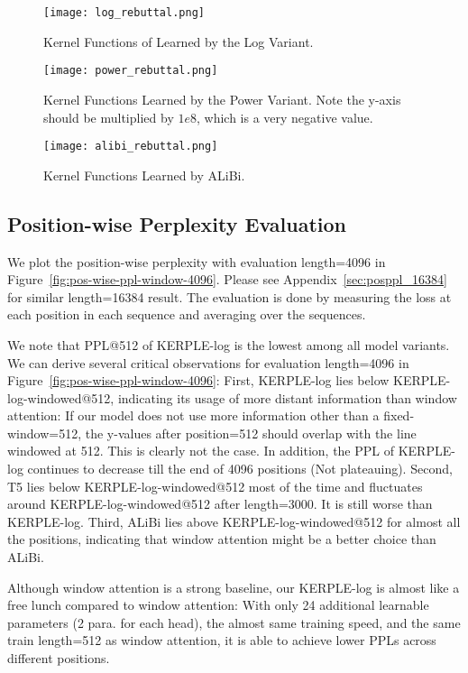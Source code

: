 \begin{figure*}[!ht]
\centering
\caption{Kernel Functions of Learned by the Log Variant.}
\texttt{[image: log\_rebuttal.png]}
\label{fig:log_rebuttal}
\end{figure*}

\begin{figure*}[!ht]
\centering
\caption{Kernel Functions Learned by the Power Variant. Note the y-axis should be multiplied by $1e8$, which is a very negative value.}
\texttt{[image: power\_rebuttal.png]}
\label{fig:power_rebuttal}
\end{figure*}

\begin{figure*}[!ht]
\centering
\caption{Kernel Functions Learned by ALiBi.}
\texttt{[image: alibi\_rebuttal.png]}
\label{fig:alibi_rebuttal}
\end{figure*}

\subsection{Position-wise Perplexity Evaluation}
We plot the position-wise perplexity with evaluation length=4096 in Figure~\ref{fig:pos-wise-ppl-window-4096}. Please see Appendix~\ref{sec:posppl_16384} for similar length=16384 result. The evaluation is done by measuring the loss at each position in each sequence and averaging over the sequences.

We note that PPL@512 of KERPLE-log is the lowest among all model variants. We can derive several critical observations for evaluation length=4096 in Figure~\ref{fig:pos-wise-ppl-window-4096}: First, KERPLE-log lies below KERPLE-log-windowed@512, indicating its usage of more distant information than window attention: If our model does not use more information other than a fixed-window=512, the y-values after position=512 should overlap with the line windowed at 512. This is clearly not the case. In addition, the PPL of KERPLE-log continues to decrease till the end of 4096 positions (Not plateauing). Second, T5 lies below KERPLE-log-windowed@512 most of the time and fluctuates around KERPLE-log-windowed@512 after length=3000. It is still worse than KERPLE-log. Third, ALiBi lies above KERPLE-log-windowed@512 for almost all the positions, indicating that window attention might be a better choice than ALiBi.

Although window attention is a strong baseline, our KERPLE-log is almost like a free lunch compared to window attention: With only 24 additional learnable parameters (2 para. for each head), the almost same training speed, and the same train length=512 as window attention, it is able to achieve lower PPLs across different positions.

